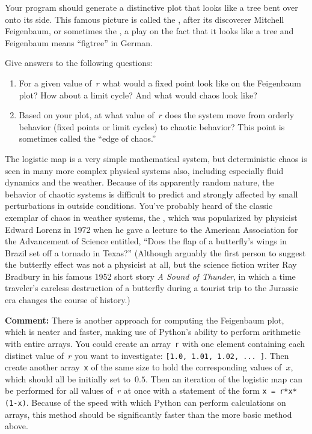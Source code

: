 \documentclass[12pt]{article}
\begin{document}
\begin{exercises}
Your program should generate a distinctive plot that looks like a tree bent
over onto its side.  This famous picture is called the
, after its discoverer Mitchell
Feigenbaum, or sometimes the , a play on the fact
that it looks like a tree and Feigenbaum means ``figtree'' in
German.

Give answers to the following questions:
\begin{enumerate}\setlength{\itemsep}{0pt}
\item For a given value of~$r$ what would a fixed point look like on the
  Feigenbaum plot?  How about a limit cycle?  And what would chaos look
  like?
\item Based on your plot, at what value of~$r$ does the system move from
  orderly behavior (fixed points or limit cycles) to chaotic behavior?
  This point is sometimes called the ``edge of chaos.''
\end{enumerate}

The logistic map is a very simple mathematical system, but deterministic
chaos is seen in many more complex physical systems also, including
especially fluid dynamics and the weather.  Because of its apparently
random nature, the behavior of chaotic systems is difficult to predict and
strongly affected by small perturbations in outside conditions.  You've
probably heard of the classic exemplar of chaos in weather systems, the
, which was popularized by physicist Edward Lorenz
in 1972 when he gave a lecture to the American Association for the
Advancement of Science entitled, ``Does the flap of a butterfly's wings in
Brazil set off a tornado in Texas?''  (Although arguably the first person
to suggest the butterfly effect was not a physicist at all, but the science
fiction writer Ray Bradbury in his famous 1952 short story \textit{A Sound
  of Thunder}, in which a time traveler's careless destruction of a
butterfly during a tourist trip to the Jurassic era changes the course of
history.)

\medskip \textbf{Comment:} There is another approach for computing the
Feigenbaum plot, which is neater and faster, making use of Python's ability
to perform arithmetic with entire arrays.  You could create an
array~\Verb|r| with one element containing each distinct value of~$r$ you
want to investigate: \Verb|[1.0, 1.01, 1.02, ... ]|.  Then create another
array~\Verb|x| of the same size to hold the corresponding values of~$x$,
which should all be initially set to~$0.5$.  Then an iteration of the
logistic map can be performed for all values of~$r$ at once with a
statement of the form \Verb|x = r*x*(1-x)|.  Because of the speed with
which Python can perform calculations on arrays, this method should be
significantly faster than the more basic method above.



\end{exercises}
\end{document}
